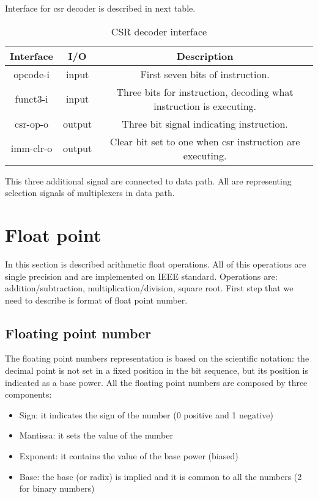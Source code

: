 \documentclass{scrreprt}
\begin{document}
\newline
Interface for csr decoder is described in next table. 
\begin{table}[htb!]
            \centering
            \begin{tabular}{|c|c|c|} \hline 
             Interface & I/O & Description \\ \hline  
             opcode-i & input & First seven bits of instruction.  \\ \hline
             funct3-i& input & Three bits for instruction, decoding what instruction is executing.  \\ \hline
             csr-op-o & output & Three bit signal indicating instruction.  \\ \hline
             imm-clr-o & output & Clear bit set to one when csr instruction are executing.  \\ \hline
        \end{tabular}
        \caption{CSR decoder interface}
        \label{tab:csrDI}
\end{table}
\newline
This three additional signal are connected to data path. All are representing selection signals of multiplexers in data path. 

\newpage
{} 
\section*{Float point}
In this section is described arithmetic float operations. All of this operations are single precision and are implemented on IEEE standard. Operations are: addition/subtraction, multiplication/division, square root. 
First step that we need to describe is format of float point number.
\subsection*{Floating point number}
The floating point numbers representation is based on the scientific notation: the decimal point is not set in a fixed position in the bit sequence, but its position is indicated as a base power. All the floating point numbers are composed by three components:
\begin{itemize}
    \item Sign: it indicates the sign of the number (0 positive and 1 negative)
    \item Mantissa: it sets the value of the number
    \item Exponent: it contains the value of the base power (biased)
    \item Base: the base (or radix) is implied and it is common to all the numbers (2 for binary numbers) 
\end{itemize}
\end{document}
